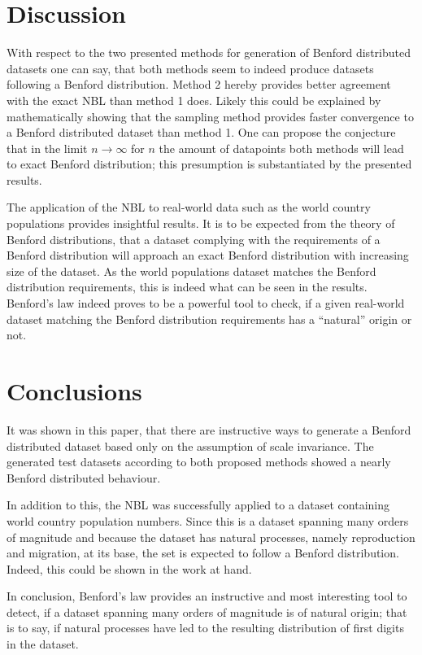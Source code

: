 \documentclass[a4paper,10pt, twocolumn]{article}
\begin{document}
\section{Discussion}
With respect to the two presented methods for generation of Benford distributed datasets one can say, that both methods seem to indeed produce datasets following a Benford distribution. Method 2 hereby provides better agreement with the exact NBL than method 1 does. Likely this could be explained by mathematically showing that the sampling method provides faster convergence to a Benford distributed dataset than method 1. One can propose the conjecture that in the limit $n \rightarrow \infty$ for $n$ the amount of datapoints both methods will lead to exact Benford distribution; this presumption is substantiated by the presented results.

The application of the NBL to real-world data such as the world country populations provides insightful results. It is to be expected from the theory of Benford distributions, that a dataset complying with the requirements of a Benford distribution will approach an exact Benford distribution with increasing size of the dataset. As the world populations dataset matches the Benford distribution requirements, this is indeed what can be seen in the results. Benford's law indeed proves to be a powerful tool to check, if a given real-world dataset matching the Benford distribution requirements has a ``natural'' origin or not.

\section{Conclusions}
It was shown in this paper, that there are instructive ways to generate a Benford distributed dataset based only on the assumption of scale invariance. The generated test datasets according to both proposed methods showed a nearly Benford distributed behaviour.

In addition to this, the NBL was successfully applied to a dataset containing world country population numbers. Since this is a dataset spanning many orders of magnitude and because the dataset has natural processes, namely reproduction and migration, at its base, the set is expected to follow a Benford distribution. Indeed, this could be shown in the work at hand.

In conclusion, Benford's law provides an instructive and most interesting tool to detect, if a dataset spanning many orders of magnitude is of natural origin; that is to say, if natural processes have led to the resulting distribution of first digits in the dataset.

\appendix





\end{document}
